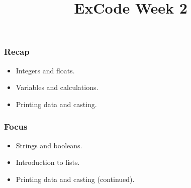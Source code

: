 \documentclass{beamer}
\title{ExCode Week 2}
\institute{University of Exeter}
\date{\displaydate{today}}
\begin{document}
\frame{\titlepage}

\begin{frame}
	\frametitle{Recap}

	\begin{itemize}
		\item{Integers and floats.}
		\item{Variables and calculations.}
		\item{Printing data and casting.}
	\end{itemize}
\end{frame}

\begin{frame}
	\frametitle{Focus}

	\begin{itemize}
		\item{Strings and booleans.}
		\item{Introduction to lists.}
		\item{Printing data and casting (continued).}
	\end{itemize}
\end{frame}
\end{document}
